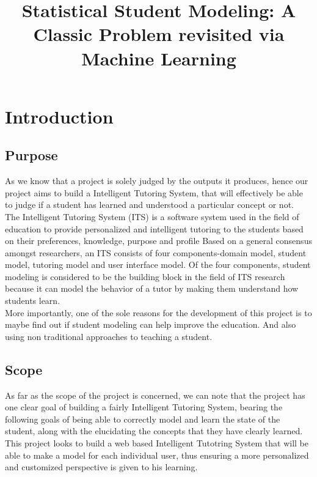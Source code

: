 \documentclass[12pt,a4paper,oneside]{report}
\author{}								%
\date{}											%
\begin{document}
\title{Statistical Student Modeling: A Classic Problem revisited via Machine Learning}
\author{}

\chapter{Introduction}
 \section{Purpose}
 \begin{itemize}
As we know that a project is solely judged by the outputs it produces, hence our project aims to build a Intelligent Tutoring System, that will effectively be able to judge if a student has learned and understood a
particular concept or not.\\
The Intelligent Tutoring System (ITS) is a software system used in the field of education to provide personalized and intelligent tutoring to the students based on their preferences, knowledge, purpose and profile
Based on a general consensus amongst researchers, an ITS consists of four components-domain model, student model, tutoring model and user interface model. Of the four components, student modeling is considered to be the building block in the field of ITS research because it can model the behavior of a tutor by making them understand how students learn.\\
More importantly, one of the sole reasons for the development of this project is to maybe find out if student modeling can help improve the education. And also using non traditional approaches to teaching a student.
 \end{itemize}
 \section{Scope}
 \begin{itemize}
As far as the scope of the project is concerned, we can note that the project has one clear goal of building a fairly Intelligent Tutoring System, bearing the following goals of being able to correctly model and learn the state of the student, along with the elucidating the concepts that they have clearly learned.\\
This project looks to build a web based Intelligent Tutotring System that will be able to make a model for each individual user, thus ensuring a more personalized and customized perspective is given to his learning.
 \end{itemize}
 
\end{document}
